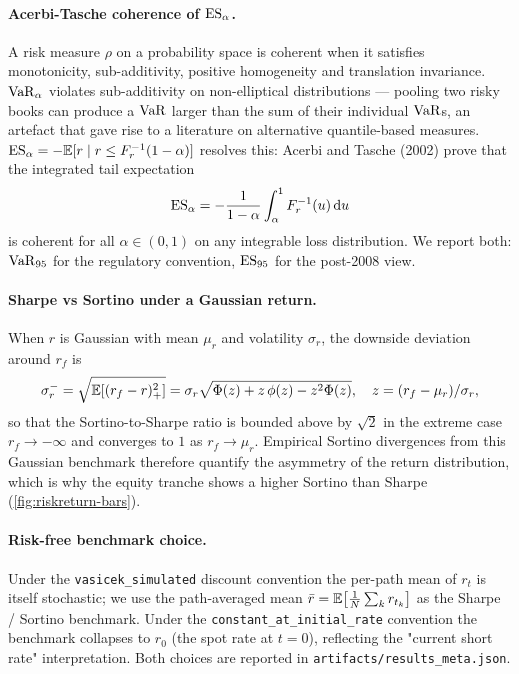 \paragraph{Acerbi-Tasche coherence of $\operatorname{ES}_\alpha$.}
A risk measure $\rho$ on a probability space is coherent
\autocite{AcerbiTasche2002} when it satisfies monotonicity, sub-additivity,
positive homogeneity and translation invariance. $\operatorname{VaR}_\alpha$ violates
sub-additivity on non-elliptical distributions — pooling two risky books
can produce a $\operatorname{VaR}$ larger than the sum of their individual $\operatorname{VaR}$s, an
artefact that gave rise to a literature on alternative quantile-based
measures. $\operatorname{ES}_\alpha = -\mathbb{E}[r \mid r \le F^{-1}_r(1-\alpha)]$ resolves
this: Acerbi and Tasche (2002) prove that the integrated tail expectation
\begin{equation*}
\operatorname{ES}_\alpha = -\frac{1}{1 - \alpha}\int_\alpha^1 F^{-1}_r(u)\,\mathrm{d}u
\end{equation*}
is coherent for all $\alpha \in (0, 1)$ on any integrable loss
distribution. We report both: $\operatorname{VaR}_{95}$ for the regulatory
convention, $\operatorname{ES}_{95}$ for the post-2008 view.

\paragraph{Sharpe vs Sortino under a Gaussian return.}
When $r$ is Gaussian with mean $\mu_r$ and volatility $\sigma_r$, the
downside deviation around $r_f$ is
\begin{equation*}
\sigma^-_r = \sqrt{\mathbb{E}[(r_f - r)_+^2]}
            = \sigma_r \sqrt{\Phi(z) + z\,\phi(z) - z^2 \Phi(z)},
\quad z = (r_f - \mu_r)/\sigma_r,
\end{equation*}
so that the Sortino-to-Sharpe ratio is bounded above by $\sqrt 2$ in the
extreme case $r_f \to -\infty$ and converges to $1$ as $r_f \to \mu_r$.
Empirical Sortino divergences from this Gaussian benchmark therefore
quantify the asymmetry of the return distribution, which is why the
equity tranche shows a higher Sortino than Sharpe
(\cref{fig:riskreturn-bars}).

\paragraph{Risk-free benchmark choice.}
Under the \texttt{vasicek\_simulated} discount convention the per-path
mean of $r_t$ is itself stochastic; we use the path-averaged mean
$\bar r = \mathbb{E}\bigl[\frac{1}{N}\sum_k r_{t_k}\bigr]$ as the Sharpe / Sortino
benchmark. Under the \texttt{constant\_at\_initial\_rate} convention the
benchmark collapses to $r_0$ (the spot rate at $t = 0$), reflecting the
"current short rate" interpretation. Both choices are reported in
\texttt{artifacts/results\_meta.json}.

